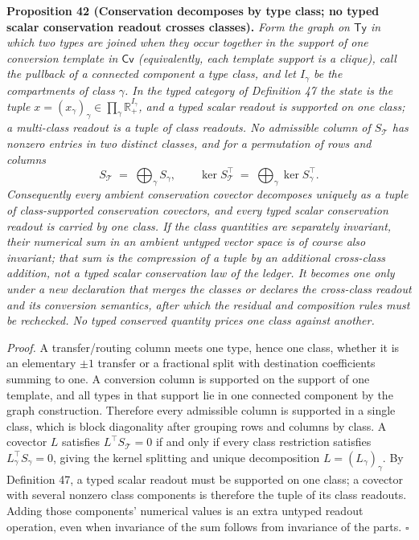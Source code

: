 \documentclass[11pt]{article}
\begin{document}
\textbf{Proposition 42 (Conservation decomposes by type class; no typed scalar conservation readout crosses classes).} \emph{Form the graph on \(\mathsf{Ty}\) in which two types are joined when they occur together in the support of one conversion template in \(\mathsf{Cv}\) (equivalently, each template support is a clique), call the pullback of a connected component a type class, and let \(I_\gamma\) be the compartments of class \(\gamma\). In the typed category of Definition 47 the state is the tuple \(x=(x_\gamma)_\gamma\in\prod_\gamma\mathbb R_+^{I_\gamma}\), and a typed scalar readout is supported on one class; a multi-class readout is a tuple of class readouts. No admissible column of \(S_{\mathcal{T}}\) has nonzero entries in two distinct classes, and for a permutation of rows and columns}
$$S_{\mathcal{T}} \;=\; \bigoplus_{\gamma} S_{\gamma}, \qquad \ker S_{\mathcal{T}}^{\top} \;=\; \bigoplus_{\gamma} \ker S_{\gamma}^{\top} .$$
\emph{Consequently every ambient conservation covector decomposes uniquely as a tuple of class-supported conservation covectors, and every typed scalar conservation readout is carried by one class. If the class quantities are separately invariant, their numerical sum in an ambient untyped vector space is of course also invariant; that sum is the compression of a tuple by an additional cross-class addition, not a typed scalar conservation law of the ledger. It becomes one only under a new declaration that merges the classes or declares the cross-class readout and its conversion semantics, after which the residual and composition rules must be rechecked. No typed conserved quantity prices one class against another.}

\emph{Proof.} A transfer/routing column meets one type, hence one class, whether it is an elementary \(\pm1\) transfer or a fractional split with destination coefficients summing to one. A conversion column is supported on the support of one template, and all types in that support lie in one connected component by the graph construction. Therefore every admissible column is supported in a single class, which is block diagonality after grouping rows and columns by class. A covector \(L\) satisfies \(L^\top S_{\mathcal{T}}=0\) if and only if every class restriction satisfies \(L_\gamma^\top S_\gamma=0\), giving the kernel splitting and unique decomposition \(L=(L_\gamma)_\gamma\). By Definition 47, a typed scalar readout must be supported on one class; a covector with several nonzero class components is therefore the tuple of its class readouts. Adding those components' numerical values is an extra untyped readout operation, even when invariance of the sum follows from invariance of the parts. \(\square\)
\end{document}
